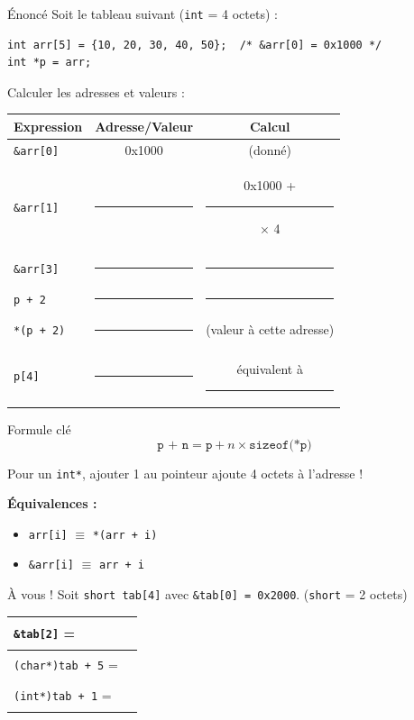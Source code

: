 \documentclass[10pt,a4paper]{article}
\begin{document}
\begin{exercicebox}{Énoncé}
Soit le tableau suivant (\texttt{int} = 4 octets) :
\begin{lstlisting}
int arr[5] = {10, 20, 30, 40, 50};  /* &arr[0] = 0x1000 */
int *p = arr;
\end{lstlisting}

Calculer les adresses et valeurs :
\end{exercicebox}

\vspace{0.5em}

\begin{center}
\renewcommand{\arraystretch}{1.5}
\begin{tabular}{|l|c|c|}
\hline
\textbf{Expression} & \textbf{Adresse/Valeur} & \textbf{Calcul} \\
\hline
\texttt{\&arr[0]} & 0x1000 & (donné) \\
\hline
\texttt{\&arr[1]} & \rule{2cm}{0.4pt} & 0x1000 + \rule{1cm}{0.4pt} $\times$ 4 \\
\hline
\texttt{\&arr[3]} & \rule{2cm}{0.4pt} & \rule{3cm}{0.4pt} \\
\hline
\texttt{p + 2} & \rule{2cm}{0.4pt} & \rule{3cm}{0.4pt} \\
\hline
\texttt{*(p + 2)} & \rule{2cm}{0.4pt} & (valeur à cette adresse) \\
\hline
\texttt{p[4]} & \rule{2cm}{0.4pt} & équivalent à \rule{2cm}{0.4pt} \\
\hline
\end{tabular}
\end{center}

\begin{examplebox}{Formule clé}
\[\boxed{\texttt{p + n} = \texttt{p} + n \times \texttt{sizeof(*p)}}\]

Pour un \texttt{int*}, ajouter 1 au pointeur ajoute 4 octets à l'adresse !

\textbf{Équivalences :}
\begin{itemize}
    \item \texttt{arr[i]} $\equiv$ \texttt{*(arr + i)}
    \item \texttt{\&arr[i]} $\equiv$ \texttt{arr + i}
\end{itemize}
\end{examplebox}

\vspace{1em}

\begin{exercicebox}{À vous !}
Soit \texttt{short tab[4]} avec \texttt{\&tab[0] = 0x2000}. (\texttt{short} = 2 octets)

\begin{center}
\renewcommand{\arraystretch}{1.3}
\begin{tabular}{|l|c|}
\hline
\texttt{\&tab[2]} = & \rule{3cm}{0.4pt} \\
\hline
\texttt{(char*)tab + 5} = & \rule{3cm}{0.4pt} \\
\hline
\texttt{(int*)tab + 1} = & \rule{3cm}{0.4pt} \\
\hline
\end{tabular}
\end{center}
\end{exercicebox}
\end{document}
